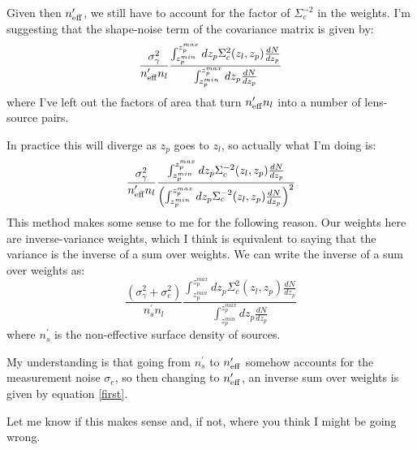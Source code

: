 \documentclass[onecolumn,amsmath,aps,fleqn, superscriptaddress]{revtex4}
\begin{document}
Given then $n_{\rm eff}^\prime$, we still have to account for the factor of $\Sigma_c^{-2}$ in the weights. I'm suggesting that the shape-noise term of the covariance matrix is given by:
\begin{equation}
\frac{\sigma_{\gamma}^2}{n_{\rm eff}^\prime n_l} \frac{\int_{z_p^{min}}^{z_p^{max}} dz_p \Sigma_c^{2}(z_l, z_p) \frac{dN}{dz_p}}{\int_{z_p^{min}}^{z_p^{max}}  dz_p  \frac{dN}{dz_p}}
\label{first}
\end{equation}
where I've left out the factors of area that turn $n_{\rm eff}^\prime n_l$ into a number of lens-source pairs.

In practice this will diverge as $z_p$ goes to $z_l$, so actually what I'm doing is: 
 \begin{equation}
\frac{\sigma_{\gamma}^2}{n_{\rm eff}^\prime n_l} \frac{\int_{z_p^{min}}^{z_p^{max}} dz_p \Sigma_c^{-2}(z_l, z_p) \frac{dN}{dz_p}}{\left(\int_{z_p^{min}}^{z_p^{max}} dz_p \Sigma_c^{-2}(z_l, z_p) \frac{dN}{dz_p}\right)^2} 
 \end{equation}
 This method makes some sense to me for the following reason. Our weights here are inverse-variance weights, which I think is equivalent to saying that the variance is the inverse of a sum over weights. We can write the inverse of a sum over weights as:
 \begin{equation}
\frac{\left(\sigma_{\gamma}^2 + \sigma_e^2\right)}{n_s^\prime n_l} \frac{\int_{z_p^{min}}^{z_p^{max}} dz_p \Sigma_c^{2}(z_l, z_p) \frac{dN}{dz_p}}{\int_{z_p^{min}}^{z_p^{max}}  dz_p  \frac{dN}{dz_p}}
 \end{equation}
 where $n_s^\prime$ is the non-effective surface density of sources.
 
 My understanding is that going from $n_s^\prime$ to $n_{\rm eff}^\prime$ somehow accounts for the measurement noise $\sigma_e$, so then changing to $n_{\rm eff}^\prime$, an inverse sum over weights is given by equation \ref{first}.
 
 Let me know if this makes sense and, if not, where you think I might be going wrong.
 


\end{document}

